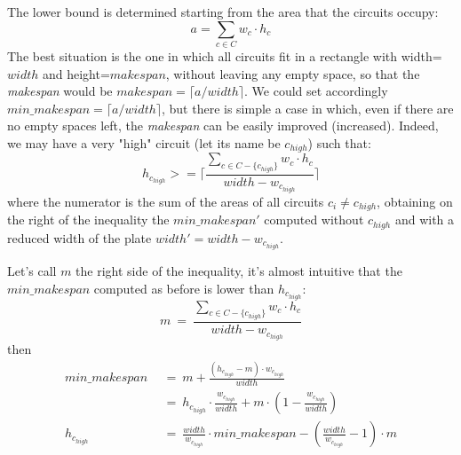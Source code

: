         The lower bound is determined starting from the area that the circuits occupy: 
        \begin{equation*}
            a = \sum_{c \in C} w_c \cdot h_c
        \end{equation*}
        The best situation is the one in which all circuits fit in a rectangle with width=$width$ and height=$makespan$,
        without leaving any empty space, so that the \textit{makespan} would be $makespan = \lceil a / width \rceil$. 
        We could set accordingly $min\_makespan = \lceil a / width \rceil$, but there is simple a case in which,
        even if there are no empty spaces left, the \textit{makespan} can be easily improved (increased). 
        Indeed, we may have a very "high" circuit (let its name be $c_{high}$) such that:
        \begin{equation}
            h_{c_{high}} >= \lceil \frac{\sum_{c \in C - \{c_{high}\}} w_c \cdot h_c}{width - w_{c_{high}}} \rceil
            \label{eq:h_high}
        \end{equation}
        where the numerator is the sum of the areas of all circuits $c_i \neq c_{high}$, obtaining on the right of
        the inequality the $min\_makespan'$ computed without $c_{high}$ and with a reduced width of the plate 
        $width' = width - w_{c_{high}}$.

        Let's call $m$ the right side of the inequality, it's almost intuitive that the $min\_makespan$ computed
        as before is lower than $h_{c_{high}}$:
        \begin{equation}
            m\ =\ \frac{\sum_{c \in C - \{c_{high}\}} w_c \cdot h_c}{width - w_{c_{high}}}
            \label{eq:m}
        \end{equation}
        then
        \begin{align*}
            min\_makespan\  &\ =\ m + \frac{(h_{c_{high}} - m) \cdot w_{c_{high}}}{width}                                               \\
                            &\ =\ h_{c_{high}} \cdot \frac{w_{c_{high}}}{width} + m \cdot \left(1 - \frac{w_{c_{high}}}{width}\right)   \\
            h_{c_{high}}\   &\ =\ \frac{width}{w_{c_{high}}} \cdot min\_makespan - \left( \frac{width}{w_{c_{high}}} - 1\right) \cdot m
        \end{align*}

